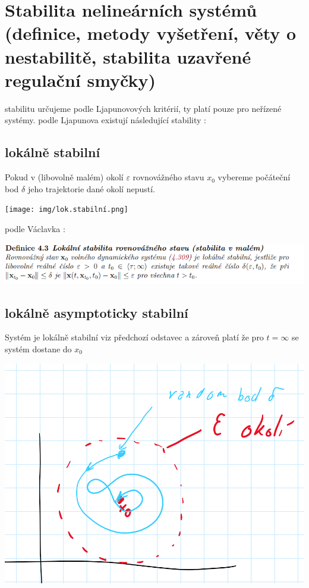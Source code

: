 \section{Stabilita nelineárních systémů (definice, metody vyšetření, věty o nestabilitě, stabilita uzavřené regulační
  smyčky)}

stabilitu určujeme podle Ljapunovových kritérií, ty platí pouze pro neřízené systémy.
podle Ljapunova existují následující stability :

\subsection{lokálně stabilní}
Pokud v (libovolně malém) okolí $\varepsilon $ rovnovážného stavu $x_0$ vybereme počáteční bod $\delta $ jeho trajektorie dané okolí nepustí.

\texttt{[image: img/lok.stabilní.png]}

podle Václavka :

\includegraphics{img/vaclave.lok.png}

\subsection{lokálně asymptoticky stabilní}
Systém je lokálně stabilní viz předchozí odstavec a zároveň platí že pro $t=\infty$ se systém dostane do $x_0$

\includegraphics[scale = 0.6]{img/lok.asypt.stab.png}

